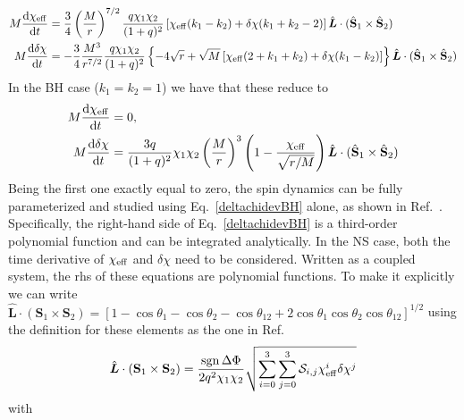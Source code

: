 \documentclass[floats,floatfix,showpacs,amssymb,prd,twocolumn,superscriptaddress,nofootinbib,nolongbibliography,reprint,onecolumn]{revtex4-2}
\DeclareMathOperator\sign{sgn}
\renewcommand{\vec}[1]{\mathbf{#1}}
\begin{document}
\begin{align}\label{chieffdevNS}
M\frac{\dd  \chi_{\rm eff} }{\dd t}&=\frac{3}{4} \left(\frac{M}{r}\right)^{7/2} \frac{q \chi_1 \chi_2 }{(1+q)^2}\left[ \chi_{\rm eff} (k_1-k_2)+\delta \chi (k_1+k_2-2)\right] \hat{\boldsymbol{L}} \cdot (\hat{\vec{S}}_1 \times \hat{\vec{S}}_2 )\\\label{deltachidevNS}
M\frac{\dd \delta \chi }{\dd t}&=-\frac{3}{4} \frac{M^3}{r^{7/2}} \frac{q \chi_1 \chi_2 }{(1+q)^2}\left\{-4 \sqrt{r} +\sqrt{M}\left[ \chi_{\rm eff} (2+k_1+k_2)+\delta \chi (k_1-k_2)\right]\right\}\hat{\boldsymbol{L}} \cdot (\hat{\vec{S}}_1 \times \hat{\vec{S}}_2 )
 \end{align}
In the BH case ($k_1=k_2=1$) we have that these reduce to
\begin{align}\label{chieffdevBH}
M \frac{\dd \chi_{\rm eff}}{\dd t}& = 0,\\
\label{deltachidevBH}
M \frac{\dd \delta\chi}{\dd t}&=\frac{3q}{(1+q)^2} \chi_1 \chi_2 \left(\frac{M}{r}\right)^3 \left(1-\frac{\chi_{\rm eff}}{\sqrt{r/M}}\right) \hat{\boldsymbol{L}} \cdot (\hat{\vec{S}}_1 \times \hat{\vec{S}}_2 )
\end{align}
Being the first one exactly equal to zero, the spin dynamics can be fully parameterized and studied using Eq.~\ref{deltachidevBH} alone, as shown in Ref.~\cite{2023PhRvD.108b4042G}. Specifically, the right-hand side of Eq.~\ref{deltachidevBH} is a third-order polynomial function and can be integrated analytically.  
In the NS case, both the time derivative of $\chi_{\rm eff}$ and $\delta \chi$ need to be considered. Written as a coupled system, the rhs of these equations are polynomial functions. To make it explicitly we can write $\hat{\boldsymbol{L}} \cdot (\vec{S}_1 \times \vec{S}_2 )=[1- \cos \theta_1-\cos \theta_2- \cos \theta_{12}+ 2 \cos \theta_1 \cos \theta_2 \cos \theta_{12}]^{1/2}$  using the definition for these elements as the one in Ref.~\cite{2023PhRvD.108b4042G}
\begin{align}\label{polypart}
\hat{\boldsymbol{L}} \cdot (\vec{S}_1 \times \vec{S}_2)= \frac{\sign \Delta \Phi}{2 q^2 \chi_1 \chi_2} \sqrt{\sum_{ i=0}^{3} \sum_{ j=0}^{3}  \mathcal{S}_{i,j} \chi_{\rm eff}^{i}  \delta \chi^{j}}
\end{align}
with 
\end{document}
